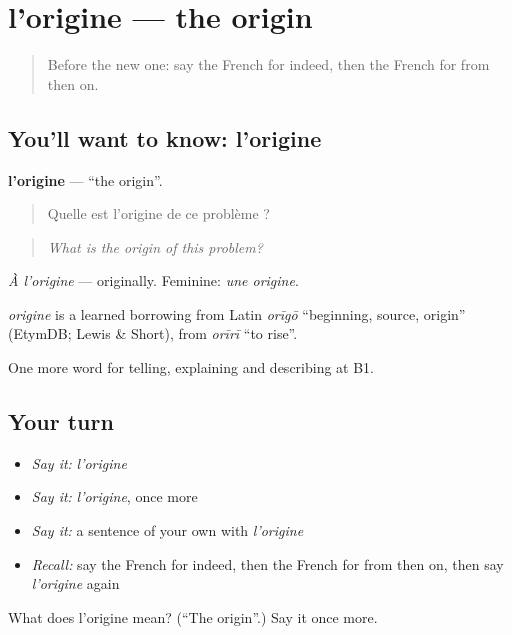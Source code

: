 \section[l'origine]{l'origine — the origin}

\label{lesson:FR-C348-origine}



\begin{quote}
Before the new one: say the French for indeed, then the French for from then on.
\end{quote}

\subsection*{You'll want to know: l'origine}
\textbf{l'origine} — \textquotedblleft{}the origin\textquotedblright{}.

\begin{quote}
Quelle est l'origine de ce problème ?
\end{quote}

\begin{quote}
\emph{What is the origin of this problem?}
\end{quote}

\emph{À l'origine} — originally. Feminine: \emph{une origine}.

\begin{cousinweb}
\emph{origine} is a learned borrowing from Latin \emph{orīgō} \textquotedblleft{}beginning, source, origin\textquotedblright{} (EtymDB; Lewis \& Short), from \emph{orīrī} \textquotedblleft{}to rise\textquotedblright{}.
\end{cousinweb}

\begin{grammarlens}[title={What you've built}]
One more word for telling, explaining and describing at B1.
\end{grammarlens}

\subsection*{Your turn}
\begin{itemize}
\raggedright
  \item \emph{Say it:} \emph{l'origine}
  \item \emph{Say it:} \emph{l'origine}, once more
  \item \emph{Say it:} a sentence of your own with \emph{l'origine}
  \item \emph{Recall:} say the French for indeed, then the French for from then on, then say \emph{l'origine} again
\end{itemize}

\begin{tcolorbox}[breakable,colback=teal!4,colframe=teal!35!black,title={Before you move on}]
What does l'origine mean? (\textquotedblleft{}The origin\textquotedblright{}.) Say it once more.
\end{tcolorbox}
